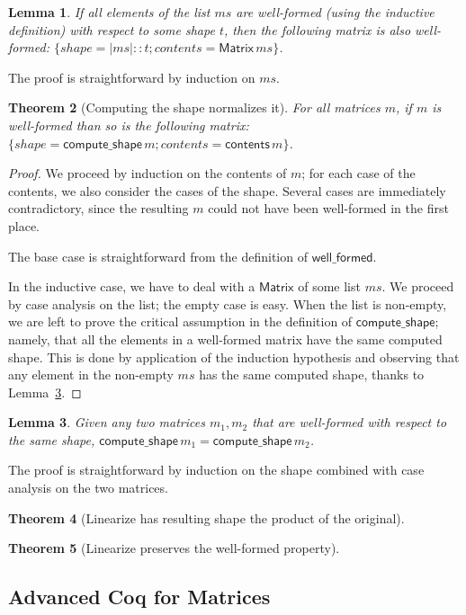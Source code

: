 \documentclass[11pt,conference]{IEEEtran}
\newcommand{\var}[1]{\mathit{#1}}
\newcommand{\func}[1]{\mathsf{#1}}
\theoremstyle{plain} %
\newtheorem{thm}{Theorem}[section]
\newtheorem{lem}[thm]{Lemma}
\theoremstyle{definition}
\theoremstyle{remark}
\begin{document}
\begin{lem}\label{Lem:wfI_all_wf_t}
    If all elements of the list \(\var{ms}\) are well-formed (using the inductive
    definition) with respect to some shape \(t\), then the following matrix is
    also well-formed: \(\{ \var{shape} = |\var{ms}| :: t; \var{contents} =
    \func{Matrix}\, \var{ms} \}\).
\end{lem}

The proof is straightforward by induction on \(\var{ms}\).

\begin{thm}[Computing the shape normalizes it]\label{Th:compute_shape_wf_normalizes}
    For all matrices \(m\), if \(m\) is well-formed than so is the following
    matrix: \(\{ \var{shape} = \func{compute\_shape}\, m; \var{contents} =
    \func{contents}\, m \}\).
\end{thm}

\begin{proof}
    We proceed by induction on the contents of \(m\); for each case of the
    contents, we also consider the cases of the shape. Several cases are
    immediately contradictory, since the resulting \(m\) could not have been
    well-formed in the first place.

    The base case is straightforward from the definition of
    \(\func{well\_formed}\).

    In the inductive case, we have to deal with a \(\func{Matrix}\) of some list
    \(\var{ms}\). We proceed by case analysis on the list; the empty case is
    easy. When the list is non-empty, we are left to prove the critical
    assumption in the definition of \(\func{compute\_shape}\); namely, that all
    the elements in a well-formed matrix have the same computed shape. This is
    done by application of the induction hypothesis and observing that any
    element in the non-empty \(\var{ms}\) has the same computed shape, thanks to
    Lemma~\ref{Lem:wf_same_shape}.
\end{proof}

\begin{lem}\label{Lem:wf_same_shape}
    Given any two matrices \(m_1, m_2\) that are well-formed with respect to the
    same shape, \(\func{compute\_shape}\, m_1 = \func{compute\_shape}\, m_2\).
\end{lem}

The proof is straightforward by induction on the shape combined with case
analysis on the two matrices.

\begin{thm}[Linearize has resulting shape the product of the original]\label{Th:linearize_product}
\end{thm}

\begin{thm}[Linearize preserves the well-formed property]\label{Th:linearize_wf}
\end{thm}

\subsection{Advanced Coq for Matrices}\label{S:matrix_coq}

{\printbibliography}
\end{document}
